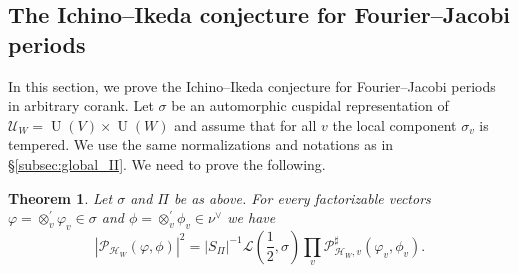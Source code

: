 \documentclass[letterpaper,11pt]{amsart}
\newcommand{\cH}{\mathcal{H}}
\newcommand{\cL}{\mathcal{L}}
\newcommand{\cP}{\mathcal{P}}
\newcommand{\cU}{\mathcal{U}}
\newcommand{\<}{\negthickspace}
\DeclareMathOperator{\U}{U}
\theoremstyle{definition}
\theoremstyle{plain}
\newtheorem{theorem}[definition]{Theorem}
\theoremstyle{remark}
\numberwithin{equation}{section}
\begin{document}
\subsection{The Ichino--Ikeda conjecture for Fourier--Jacobi periods}
\label{sec:proof_II_corank}

In this section, we prove the Ichino--Ikeda conjecture for Fourier--Jacobi periods in arbitrary corank. Let $\sigma$ be an automorphic cuspidal representation of $\cU_W=\U(V) \times \U(W)$ and assume that for all $v$ the local component $\sigma_v$ is tempered. We use the same normalizations and notations as in \S\ref{subsec:global_II}. We need to prove the following. 

\begin{theorem}
    \label{thm:factorization_intro}
    Let $\sigma$ and $\Pi$ be as above. For every factorizable vectors $\varphi =
\otimes_v^{'} \varphi_v \in \sigma$ and $\phi=\otimes_v^{'} \phi_v \in
\nu^\vee$ we have
    \begin{equation}
    \label{eq:IY_facto}
        |\cP_{\cH_W}(\varphi,\phi)|^2=|S_\Pi|^{-1} \cL(\frac{1}{2},\sigma) \prod_v \cP^\sharp_{\cH_W,v}(\varphi_v,\phi_v).
    \end{equation}
\end{theorem}
\end{document}
